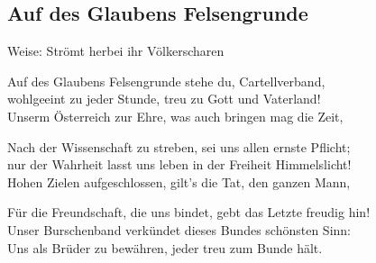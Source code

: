 
\subsection*{Auf des Glaubens Felsengrunde}
%
%

\hfill%
Weise: Strömt herbei ihr Völkerscharen%


\thestrophe Auf des Glaubens Felsengrunde stehe du, Cartellverband, \\
wohlgeeint zu jeder Stunde, treu zu Gott und Vaterland! \\
Unserm Österreich zur Ehre, was auch bringen mag die Zeit, \\

\thestrophe Nach der Wissenschaft zu streben, sei uns allen ernste Pflicht; \\
nur der Wahrheit lasst uns leben in der Freiheit Himmelslicht! \\
Hohen Zielen aufgeschlossen, gilt's die Tat, den ganzen Mann, \\

\thestrophe Für die Freundschaft, die uns bindet, gebt das Letzte freudig hin! \\
Unser Burschenband verkündet dieses Bundes schönsten Sinn: \\
Uns als Brüder zu bewähren, jeder treu zum Bunde hält.\\
